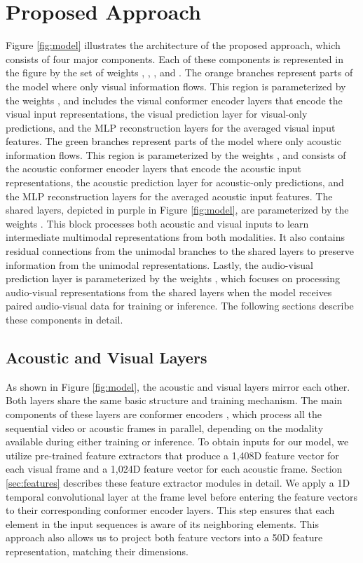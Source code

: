 \documentclass{article}
\begin{document}
\section{Proposed Approach}
\label{sec:ProposedApproach}

Figure \ref{fig:model} illustrates the architecture of the proposed approach, which consists of four major components. Each of these components is represented in the figure by the set of weights , , , and . The orange branches represent parts of the model where only visual information flows. This region is parameterized by the weights , and includes the visual conformer encoder layers that encode the visual input representations, the visual prediction layer for visual-only predictions, and the MLP reconstruction layers for the averaged visual input features. The green branches represent parts of the model where only acoustic information flows. This region is parameterized by the weights , and consists of the acoustic conformer encoder layers that encode the acoustic input representations, the acoustic prediction layer for acoustic-only predictions, and the MLP reconstruction layers for the averaged acoustic input features. The shared layers, depicted in purple in Figure \ref{fig:model}, are parameterized by the weights . This block processes both acoustic and visual inputs to learn intermediate multimodal representations from both modalities. It also contains residual connections from the unimodal branches to the shared layers to preserve information from the unimodal representations. Lastly, the audio-visual prediction layer is parameterized by the weights , which focuses on processing audio-visual representations from the shared layers when the model receives paired audio-visual data for training or inference. The following sections describe these components in detail.

\subsection{Acoustic and Visual Layers}
\label{ssec:acousticvisual}

As shown in Figure \ref{fig:model}, the acoustic and visual layers mirror each other. Both layers share the same basic structure and training mechanism. The main components of these layers are conformer encoders \cite{gulati_2020}, which process all the sequential video or acoustic frames in parallel, depending on the modality available during either training or inference. To obtain inputs for our model, we utilize pre-trained feature extractors that produce a 1,408D feature vector for each visual frame and a 1,024D feature vector for each acoustic frame. Section \ref{sec:features} describes these feature extractor modules in detail. We apply a 1D temporal convolutional layer at the frame level before entering the feature vectors to their corresponding conformer encoder layers. This step ensures that each element in the input sequences is aware of its neighboring elements. This approach also allows us to project both feature vectors into a 50D feature representation, matching their dimensions. 
\end{document}
